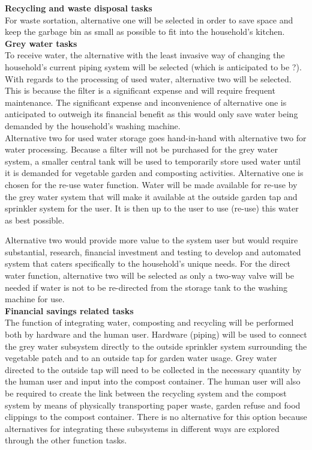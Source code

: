 \documentclass[a4paper,11pt,fleqn]{report}
\begin{document}
\textbf{Recycling and waste disposal tasks}\\
For waste sortation, alternative one will be selected in order to save space and keep the garbage bin as small as possible to fit into the household's kitchen.\\

\textbf{Grey water tasks}\\
To receive water, the alternative with the least invasive way of changing the household's current piping system will be selected (which is anticipated to be ?). With regards to the processing of used water, alternative two will be selected. This is because the filter is a significant expense and will require frequent maintenance. The significant expense and inconvenience of alternative one is anticipated to outweigh its financial benefit as this would only save water being demanded by the household's washing machine.\\

Alternative two for used water storage goes hand-in-hand with alternative two for water processing. Because a filter will not be purchased for the grey water system, a smaller central tank will be used to temporarily store used water until it is demanded for vegetable garden and composting activities. Alternative one is chosen for the re-use water function. Water will be made available for re-use by the grey water system that will make it available at the outside garden tap and sprinkler system for the user. It is then up to the user to use (re-use) this water as best possible.

Alternative two would provide more value to the system user but would require substantial, research, financial investment and testing to develop and automated system that caters specifically to the household's unique needs. For the direct water function, alternative two will be selected as only a two-way valve will be needed if water is not to be re-directed from the storage tank to the washing machine for use.\\

\textbf{Financial savings related tasks}\\
The function of integrating water, composting and recycling will be performed both by hardware and the human user. Hardware (piping) will be used to connect the grey water subsystem directly to the outside sprinkler system surrounding the vegetable patch and to an outside tap for garden water usage. Grey water directed to the outside tap will need to be collected in the necessary quantity by the human user and input into the compost container. The human user will also be required to create the link between the recycling system and the compost system by means of physically transporting paper waste, garden refuse and food clippings to the compost container. There is no alternative for this option because alternatives for integrating these subsystems in different ways are explored through the other function tasks.
\end{document}
